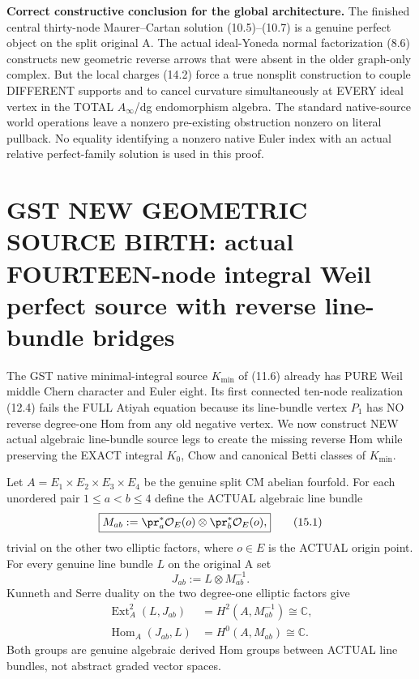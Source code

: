 \documentclass[11pt,a4paper]{article}
\begin{document}
\noindent\textbf{Correct constructive conclusion for the global
architecture.}
The finished
central
thirty-node
Maurer--Cartan
solution
(10.5)--(10.7)
is a genuine
perfect object
on the split
original A.
The actual
ideal-Yoneda
normal factorization
(8.6)
constructs
new geometric
reverse arrows
that were
absent in the
older graph-only
complex.
But the local
charges (14.2)
force a true
nonsplit
construction
to couple
DIFFERENT
supports and
to cancel
curvature
simultaneously
at EVERY ideal
vertex in
the TOTAL
\(A_\infty\)/dg
endomorphism
algebra.
The standard
native-source
world
operations
leave a
nonzero
pre-existing
obstruction
nonzero on
literal pullback.
No equality
identifying
a nonzero
native Euler
index with
an actual
relative
perfect-family
solution is
used in
this proof.

\section{GST NEW GEOMETRIC SOURCE BIRTH: actual FOURTEEN-node integral Weil perfect source with reverse line-bundle bridges}
The GST native
minimal-integral source
\(K_{\min}\)
of (11.6)
already has
PURE Weil middle
Chern character
and Euler eight.
Its first connected
ten-node realization
(12.4) fails
the FULL Atiyah
equation because
its line-bundle
vertex \(P_1\)
has NO reverse
degree-one Hom
from any old
negative vertex.
We now construct
NEW actual algebraic
line-bundle source
legs to create
the missing
reverse Hom
while preserving
the EXACT integral
\(K_0\), Chow
and canonical Betti
classes of
\(K_{\min}\).

Let \(A=E_1\times
E_2\times E_3\times E_4\)
be the genuine split
CM abelian fourfold.
For each unordered
pair \(1\le a<b\le4\)
define the ACTUAL
algebraic line bundle
\[
 \boxed{
 M_{ab}:=
 \pr_a^*\mathcal O_E(o)
       \otimes
 \pr_b^*\mathcal O_E(o),
 }                                                       \tag{15.1}
\]
trivial on the
other two elliptic
factors, where
\(o\in E\)
is the
ACTUAL origin
point. For every
genuine line
bundle \(L\) on
the original A
set
\[
         J_{ab}:=L\otimes M_{ab}^{-1}.
                                                               \tag{15.2}
\]
Kunneth and
Serre duality
on the two
degree-one
elliptic
factors give
\[
 \boxed{
 \begin{aligned}
 \operatorname{Ext}^2_A(L,J_{ab})
    &=H^2(A,M_{ab}^{-1})
                 \cong\mathbb C,\\
 \operatorname{Hom}_A(J_{ab},L)
    &=H^0(A,M_{ab})
                 \cong\mathbb C.
 \end{aligned}}                                          \tag{15.3}
\]
Both groups are
genuine algebraic
derived Hom groups
between ACTUAL
line bundles,
not abstract
graded vector
spaces.
\end{document}
